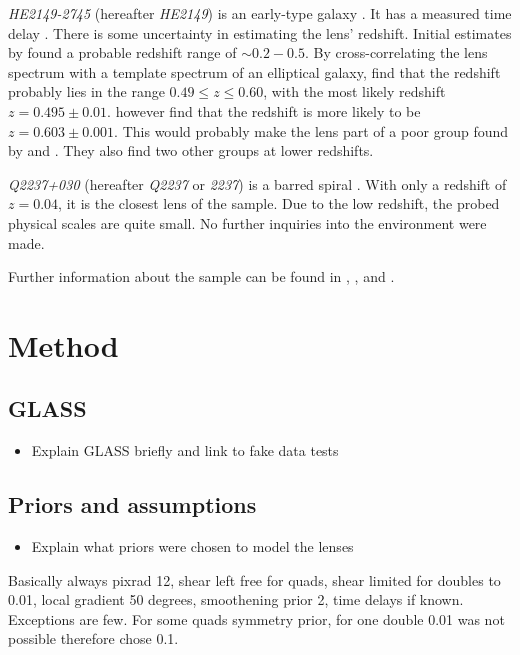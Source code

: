 \documentclass[useAMS,usenatbib]{mn2e}
\begin{document}
\textit{HE2149-2745} (hereafter \textit{HE2149}) is an early-type galaxy \citep{2007A&A...465...51E}. It has a measured time delay \citep{2002A&A...383...71B}. There is some uncertainty in estimating the lens' redshift. Initial estimates by \cite{1996A&A...315L.405W,2000ApJ...543..131K} found a probable redshift range of $\sim0.2-0.5$. By cross-correlating the lens spectrum with a template spectrum of an elliptical galaxy, \cite{2002A&A...383...71B} find that the redshift probably lies in the range $0.49\leq z \leq 0.60$, with the most likely redshift $z=0.495\pm0.01$. \cite{2007A&A...465...51E} however find that the redshift is more likely to be $z=0.603\pm0.001$. This would probably make the lens part of a poor group found by \cite{2006ApJ...641..169M} and \cite{2006ApJ...646...85W}. They also find two other groups at lower redshifts.

\textit{Q2237+030} (hereafter \textit{Q2237} or \textit{2237}) is a barred spiral \citep{1988AJ.....95.1331Y}. With only a redshift of $z=0.04$, it is the closest lens of the sample. Due to the low redshift, the probed physical scales are quite small. No further inquiries into the environment were made.

Further information about the sample can be found in \cite{leier11phd}, \cite{2011ApJ...740...97L}, and \cite{2012A&A...538A..99S}.


\section{Method}\label{sec:method}
\subsection{GLASS}
\begin{itemize}
\item Explain GLASS briefly and link to fake data tests
\end{itemize}

\subsection{Priors and assumptions}
\begin{itemize}
\item Explain what priors were chosen to model the lenses
\end{itemize}

Basically always pixrad 12, shear left free for quads, shear limited for doubles to 0.01, local gradient 50 degrees, smoothening prior 2, time delays if known. Exceptions are few. For some quads symmetry prior, for one double 0.01 was not possible therefore chose 0.1.
\end{document}
